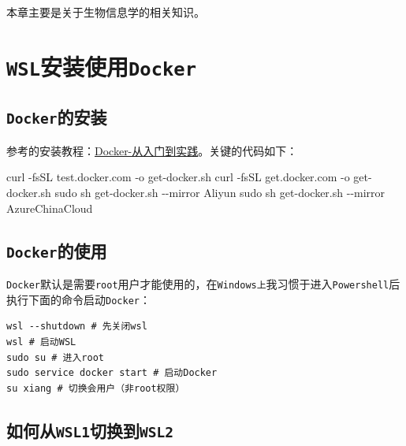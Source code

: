 \documentclass[
]{book}
\newenvironment{Shaded}{\begin{snugshade}}{\end{snugshade}}
\newcommand{\NormalTok}[1]{#1}
\newcommand{\SpecialCharTok}[1]{\textcolor[rgb]{0.00,0.00,0.00}{#1}}
\begin{document}
本章主要是关于生物信息学的相关知识。

\hypertarget{wslux5b89ux88c5ux4f7fux7528docker}{%
\section{\texorpdfstring{\texttt{WSL}安装使用\texttt{Docker}}{WSL安装使用Docker}}\label{wslux5b89ux88c5ux4f7fux7528docker}}

\hypertarget{dockerux7684ux5b89ux88c5}{%
\subsection{\texorpdfstring{\texttt{Docker}的安装}{Docker的安装}}\label{dockerux7684ux5b89ux88c5}}

参考的安装教程：\href{https://yeasy.gitbook.io/docker_practice/install/ubuntu}{Docker-从入门到实践}。关键的代码如下：

\begin{Shaded}
\begin{Highlighting}[]
\NormalTok{curl }\SpecialCharTok{{-}}\NormalTok{fsSL test.docker.com }\SpecialCharTok{{-}}\NormalTok{o get}\SpecialCharTok{{-}}\NormalTok{docker.sh}
\NormalTok{curl }\SpecialCharTok{{-}}\NormalTok{fsSL get.docker.com }\SpecialCharTok{{-}}\NormalTok{o get}\SpecialCharTok{{-}}\NormalTok{docker.sh}
\NormalTok{sudo sh get}\SpecialCharTok{{-}}\NormalTok{docker.sh }\SpecialCharTok{{-}{-}}\NormalTok{mirror Aliyun}
\NormalTok{sudo sh get}\SpecialCharTok{{-}}\NormalTok{docker.sh }\SpecialCharTok{{-}{-}}\NormalTok{mirror AzureChinaCloud}
\end{Highlighting}
\end{Shaded}

\hypertarget{dockerux7684ux4f7fux7528}{%
\subsection{\texorpdfstring{\texttt{Docker}的使用}{Docker的使用}}\label{dockerux7684ux4f7fux7528}}

\texttt{Docker}默认是需要\texttt{root}用户才能使用的，在\texttt{Windows上}我习惯于进入\texttt{Powershell}后执行下面的命令启动\texttt{Docker}：

\begin{verbatim}
wsl --shutdown # 先关闭wsl
wsl # 启动WSL
sudo su # 进入root
sudo service docker start # 启动Docker
su xiang # 切换会用户（非root权限）
\end{verbatim}

\hypertarget{ux5982ux4f55ux4ecewsl1ux5207ux6362ux5230wsl2}{%
\subsection{\texorpdfstring{如何从\texttt{WSL1}切换到\texttt{WSL2}}{如何从WSL1切换到WSL2}}\label{ux5982ux4f55ux4ecewsl1ux5207ux6362ux5230wsl2}}
\end{document}
